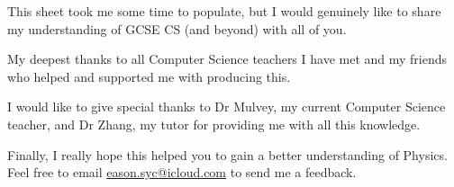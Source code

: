 \documentclass[8pt]{article}
\theoremstyle{remark}
\begin{document}
        This sheet took me some time to populate, but I would genuinely like to share my understanding of GCSE CS (and beyond) with all of you.
        
        My deepest thanks to all Computer Science teachers I have met and my friends who helped and supported me with producing this.
        
        I would like to give special thanks to Dr Mulvey, my current Computer Science teacher, and Dr Zhang, my tutor for providing me with all this knowledge.

        Finally, I really hope this helped you to gain a better understanding of Physics. Feel free to email \href{eason.syc@icloud.com}{eason.syc@icloud.com} to send me a feedback.
\end{document}
